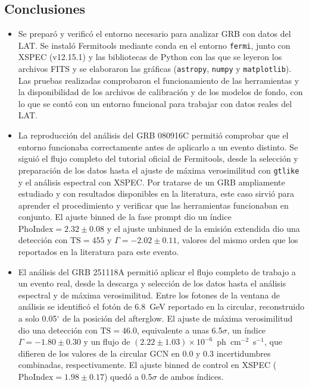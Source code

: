 \newpage
\begin{center}
\section*{Conclusiones}
\end{center}

\begin{itemize}
\setlength{\itemsep}{0.4cm}

\item Se preparó y verificó el entorno necesario para analizar GRB con datos del LAT. Se instaló Fermitools mediante conda en el entorno \texttt{fermi}, junto con XSPEC (v12.15.1) y las bibliotecas de Python con las que se leyeron los archivos FITS y se elaboraron las gráficas (\texttt{astropy}, \texttt{numpy} y \texttt{matplotlib}). Las pruebas realizadas comprobaron el funcionamiento de las herramientas y la disponibilidad de los archivos de calibración y de los modelos de fondo, con lo que se contó con un entorno funcional para trabajar con datos reales del LAT.

\item La reproducción del análisis del GRB 080916C permitió comprobar que el entorno funcionaba correctamente antes de aplicarlo a un evento distinto. Se siguió el flujo completo del tutorial oficial de Fermitools, desde la selección y preparación de los datos hasta el ajuste de máxima verosimilitud con \texttt{gtlike} y el análisis espectral con XSPEC. Por tratarse de un GRB ampliamente estudiado y con resultados disponibles en la literatura, este caso sirvió para aprender el procedimiento y verificar que las herramientas funcionaban en conjunto. El ajuste binned de la fase prompt dio un índice $\mathrm{PhoIndex} = 2.32 \pm 0.08$ y el ajuste unbinned de la emisión extendida dio una detección con $\mathrm{TS}=455$ y $\Gamma = -2.02 \pm 0.11$, valores del mismo orden que los reportados en la literatura para este evento.

\item El análisis del GRB 251118A permitió aplicar el flujo completo de trabajo a un evento real, desde la descarga y selección de los datos hasta el análisis espectral y de máxima verosimilitud. Entre los fotones de la ventana de análisis se identificó el fotón de 6.8~GeV reportado en la circular, reconstruido a solo 0.05$^{\circ}$ de la posición del afterglow. El ajuste de máxima verosimilitud dio una detección con $\mathrm{TS}=46.0$, equivalente a unas 6.5$\sigma$, un índice $\Gamma = -1.80 \pm 0.30$ y un flujo de $(2.22\pm1.03)\times10^{-6}$~ph~cm$^{-2}$~s$^{-1}$, que difieren de los valores de la circular GCN en 0.0 y 0.3 incertidumbres combinadas, respectivamente. El ajuste binned de control en XSPEC ($\mathrm{PhoIndex} = 1.98 \pm 0.17$) quedó a 0.5$\sigma$ de ambos índices.


\end{itemize}
